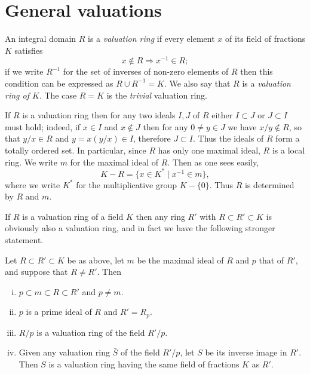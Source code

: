 \section{General valuations}\label{sec:10}

An integral domain $R$ is a \emph{valuation ring} if every element $x$ of its
field of fractions $K$ satisfies
\[
  x \notin R \Rightarrow x^{-1} \in R;
\]
if we write $R^{-1}$ for the set of inverses of non-zero elements of $R$ then this
condition can be expressed as $R \cup R^{-1} = K$. We also say that $R$ is a
\emph{valuation ring of $K$}. The case $R = K$ is the \emph{trivial} valuation ring.

If $R$ is a valuation ring then for any two ideals $I, J$ of $R$ either $I \subset J$
or $J \subset I$ must hold; indeed, if $x \in I$ and $x \notin J$ then for any $0 \neq y \in J$ we
have $x/y \notin R$, so that $y/x \in R$ and $y = x(y/x) \in I$, therefore $J \subset I$. Thus the
ideals of $R$ form a totally ordered set. In particular, since $R$ has only one
maximal ideal, $R$ is a local ring. We write $m$ for the maximal ideal of $R$.
Then as one sees easily,
\[
  K - R = \{x \in K^* \mid x^{-1} \in m\},
\]
where we write $K^*$ for the multiplicative group $K - \{0\}$. Thus $R$ is determined by $R$
and $m$.

If $R$ is a valuation ring of a field $K$ then any ring $R'$ with $R \subset R' \subset K$ is
obviously also a valuation ring, and in fact we have the following stronger
statement.

\begin{theorem}\label{thm:10.1}
Let $R \subset R' \subset K$ be as above, let $m$ be the maximal ideal of $R$
and $p$ that of $R'$, and suppose that $R \neq R'$. Then
\begin{enumerate}[(i)]
  \item $p \subset m \subset R \subset R'$ and $p \neq m$.
  \item $p$ is a prime ideal of $R$ and $R' = R_p$.
  \item $R/p$ is a valuation ring of the field $R'/p$.
  \item Given any valuation ring $\bar{S}$ of the field $R'/p$, let $S$ be its inverse image
        in $R'$. Then $S$ is a valuation ring having the same field of fractions $K$ as $R'$.
\end{enumerate}
\end{theorem}

